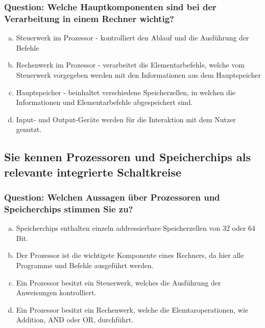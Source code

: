 \documentclass{article}
\begin{document}
\begin{adjustwidth}{2em}{2em}
\begin{adjustwidth}{2em}{2em}
\begin{adjustwidth}{1em}{}
				\subsubsection*{Question: Welche Hauptkomponenten sind bei der Verarbeitung in einem Rechner wichtig?}
				\begin{adjustwidth}{1em}{}
					\begin{enumerate}[(a)]
						\item Steuerwerk im Prozessor - kontrolliert den Ablauf und die Ausführung der Befehle
						\item Rechenwerk im Prozessor - verarbeitet die Elementarbefehle, welche vom Steuerwerk vorgegeben werden mit den Informationen aus dem Hauptspeicher
						\item Hauptspeicher - beinhaltet verschiedene Speicherzellen, in welchen die Informationen und Elementarbefehle abgespeichert sind.
						\item Input- und Output-Geräte werden für die Interaktion mit dem Nutzer genutzt.
					\end{enumerate}
				\end{adjustwidth}
			\end{adjustwidth}
			\subsection{Sie kennen Prozessoren und Speicherchips als relevante integrierte Schaltkreise}
			\begin{adjustwidth}{1em}{}
				\subsubsection*{Question: Welchen Aussagen über Prozessoren und Speicherchips stimmen Sie zu?}
				\begin{adjustwidth}{1em}{}
					\begin{enumerate}[(a)]
						\item Speicherchips enthalten einzeln addressierbare Speicherzellen von 32 oder 64 Bit.
						\item Der Prozessor ist die wichtigste Komponente eines Rechners, da hier alle Programme und Befehle ausgeführt werden.
						\item Ein Prozessor besitzt ein Steuerwerk, welches die Ausführung der Anweisungen kontrolliert.
						\item Ein Prozessor besitzt ein Rechenwerk, welche die Elemtaroperationen, wie Addition, AND oder OR, durchführt.
					\end{enumerate}
				\end{adjustwidth}
			\end{adjustwidth}

\end{adjustwidth}
\end{adjustwidth}
\end{document}
